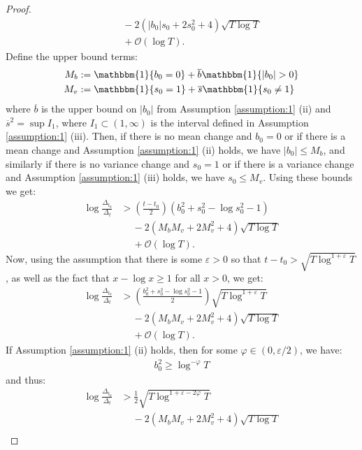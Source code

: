 \begin{proof}
\begin{align*}
    &\quad\: - 2 \left(|b_0|s_0 +2s_0^2 + 4\right) \sqrt{T \log T} \\
    &\quad\: + \mathcal{O}(\log T).
\end{align*}
Define the upper bound terms:
\begin{align*}
    M_b &:= \mathbbm{1}\{b_0 = 0\} + \overline{b}\mathbbm{1}\{|b_0| > 0\} \\
    M_v &:= \mathbbm{1}\{s_0 = 1\} + \overline{s}\mathbbm{1}\{s_0 \neq 1\} 
\end{align*}
where $\overline{b}$ is the upper bound on $|b_0|$ from Assumption \ref{assumption:1} (ii) and $\overline{s}^2 = \sup I_1$, where $I_1 \subset (1, \infty)$ is the interval defined in Assumption \ref{assumption:1} (iii). Then, if there is no mean change and $b_0 =0$ or if there is a mean change and Assumption \ref{assumption:1} (ii) holds, we have $|b_0| \leq M_b$, and similarly if there is no variance change and $s_0 =1$ or if there is a variance change and Assumption \ref{assumption:1} (iii) holds, we have $s_0 \leq M_v$. Using these bounds we get:
\begin{align*}
    \log \frac{\Delta_{t_0}}{\Delta_t} &> \left(\frac{t-t_0}{2}\right)(b_0^2 + s_0^2 - \log s_0^2 - 1) \\
    &\quad\: - 2 \left(M_bM_v +2M_v^2 + 4\right) \sqrt{T \log T} \\
    &\quad\: + \mathcal{O}(\log T).
\end{align*}
Now, using the assumption that there is some $\varepsilon >0$ so that $t-t_0 > \sqrt{T\log^{1+\varepsilon} T}$, as well as the fact that $x - \log x \geq 1$ for all $x > 0$, we get: 
\begin{align*}
    \log \frac{\Delta_{t_0}}{\Delta_t} &>  \left(\frac{b_0^2 + s_0^2 - \log s_0^2 - 1}{2}\right)\sqrt{T\log^{1+\varepsilon} T} \\
    &\quad\: - 2 \left(M_bM_v +2M_v^2 + 4\right) \sqrt{T \log T} \\
    &\quad\: + \mathcal{O}(\log T).
\end{align*}
If Assumption \ref{assumption:1} (ii) holds, then for some $\varphi \in (0, \varepsilon / 2)$, we have:
\begin{align*}
    b_0^2 \geq \log^{-\varphi} T
\end{align*}
and thus: 
\begin{align*}
    \log \frac{\Delta_{t_0}}{\Delta_t} &>  \frac{1}{2}\sqrt{T\log^{1+\varepsilon - 2\varphi} T} \\
    &\quad\: - 2 \left(M_bM_v +2M_v^2 + 4 \right) \sqrt{T \log T} \\

\end{align*}
\end{proof}
